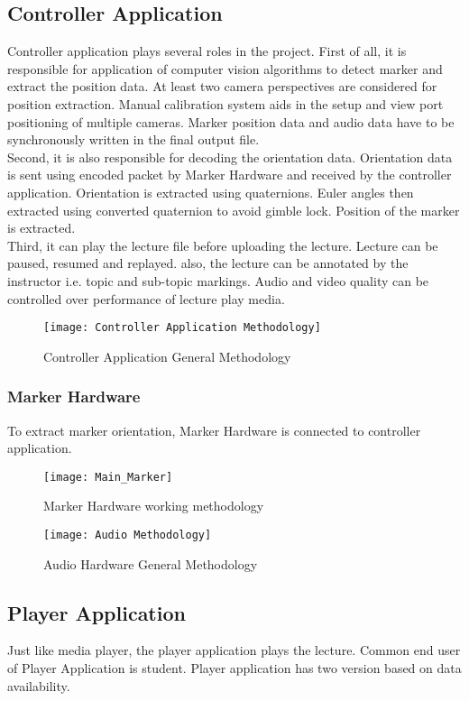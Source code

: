 \subsection{Controller Application}
Controller application plays several roles in the project. First of all, it is responsible for application of computer vision algorithms to detect marker and extract the position data. At least two camera perspectives are considered for position extraction. Manual calibration system aids in the setup and view port positioning of multiple cameras. Marker position data and audio data have to be synchronously written in the final output file.\\
Second, it is also responsible for decoding the orientation data. Orientation data is sent using encoded packet by Marker Hardware and received by the controller application. Orientation is extracted using quaternions. Euler angles then extracted using converted quaternion to avoid gimble lock. Position of the marker is extracted.\\
Third, it can play the lecture file before uploading the lecture. Lecture can be paused, resumed and replayed. also, the lecture can be annotated by the instructor i.e. topic and sub-topic markings. Audio and video quality can be controlled over performance of lecture play media.\\

\bigskip
\begin{figure}[h]
  \centering
  \texttt{[image: Controller Application Methodology]}
  \caption{Controller Application General Methodology}
\end{figure}

\subsubsection{Marker Hardware}
To extract marker orientation, Marker Hardware is connected to controller application.

\begin{figure}[h]
  \centering
  \texttt{[image: Main\_Marker]}
  \caption{Marker Hardware working methodology}
\end{figure}

\begin{figure}[h]
  \centering
  \texttt{[image: Audio Methodology]}
  \caption{Audio Hardware General Methodology}
\end{figure}


\subsection{Player Application}
Just like media player, the player application plays the lecture. Common end user of Player Application is student. Player application has two version based on data availability.
\bigskip
\bigskip
